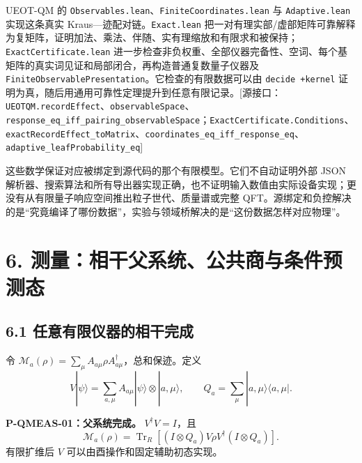 \documentclass[
  11pt,
  oneside]{book}
\begin{document}
UEOT-QM 的 \texttt{Observables.lean}、\allowbreak \texttt{FiniteCoordinates.lean} 与
\texttt{Adaptive.lean} 实现这条真实
Kraus---迹配对链。\texttt{Exact.lean}
把一对有理实部/虚部矩阵可靠解释为复矩阵，证明加法、乘法、伴随、实有理缩放和有限求和被保持；\texttt{ExactCertificate.lean}
进一步检查非负权重、全部仪器完备性、空词、每个基矩阵的真实词见证和局部闭合，再构造普通复数量子仪器及
\texttt{FiniteObservablePresentation}。它检查的有限数据可以由
\texttt{decide\ +kernel}
证明为真，随后用通用可靠性定理提升到任意有限记录。{[}源接口：\texttt{UEOTQM.recordEffect}、\allowbreak \texttt{observableSpace}、\allowbreak \texttt{response\_\allowbreak eq\_\allowbreak iff\_\allowbreak pairing\_\allowbreak observableSpace}；\texttt{ExactCertificate.Conditions}、\allowbreak \texttt{exactRecordEffect\_\allowbreak toMatrix}、\allowbreak \texttt{coordinates\_\allowbreak eq\_\allowbreak iff\_\allowbreak response\_\allowbreak eq}、\allowbreak \texttt{adaptive\_\allowbreak leafProbability\_\allowbreak eq}{]}

这些数学保证对应被绑定到源代码的那个有限模型。它们不自动证明外部 JSON
解析器、搜索算法和所有导出器实现正确，也不证明输入数值由实际设备实现；更没有从有限量子响应空间推出粒子世代、质量谱或完整
QFT。源绑定和负控解决的是``究竟编译了哪份数据''，实验与领域桥解决的是``这份数据怎样对应物理''。

\hypertarget{ch-6}{%
\chapter{6. 测量：相干父系统、公共商与条件预测态}\label{ch-6}}

\hypertarget{ux4efbux610fux6709ux9650ux4eeaux5668ux7684ux76f8ux5e72ux5b8cux6210}{%
\section{6.1
任意有限仪器的相干完成}\label{ux4efbux610fux6709ux9650ux4eeaux5668ux7684ux76f8ux5e72ux5b8cux6210}}

令
\(\mathcal M_a(\rho)=\sum_\mu A_{a\mu}\rho A_{a\mu}^\dagger\)，总和保迹。定义
\[
V|\psi\rangle=\sum_{a,\mu}A_{a\mu}|\psi\rangle\otimes|a,\mu\rangle,\qquad
Q_a=\sum_\mu|a,\mu\rangle\langle a,\mu|.
\]

\protect\hypertarget{p-qmeas-01}{}{}

\textbf{P-QMEAS-01：父系统完成。} \(V^\dagger V=I\)，且 \[
\mathcal M_a(\rho)=
\operatorname{Tr}_R[(I\otimes Q_a)V\rho V^\dagger(I\otimes Q_a)].
\] 有限扩维后 \(V\) 可以由酉操作和固定辅助初态实现。
\end{document}
